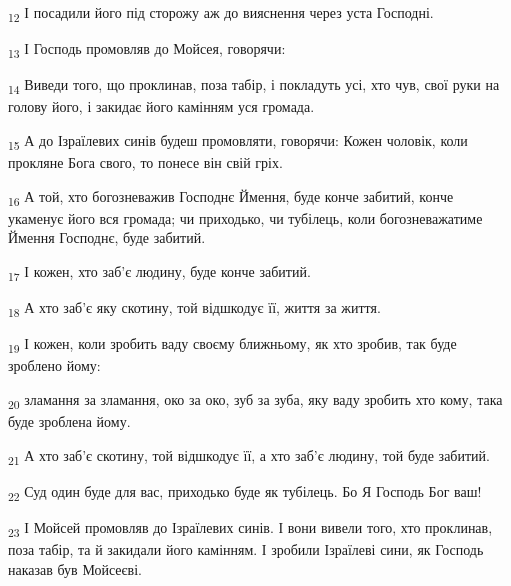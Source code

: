 \begin{tcolorbox}
\textsubscript{12} І посадили його під сторожу аж до вияснення через уста Господні.
\end{tcolorbox}
\begin{tcolorbox}
\textsubscript{13} І Господь промовляв до Мойсея, говорячи:
\end{tcolorbox}
\begin{tcolorbox}
\textsubscript{14} Виведи того, що проклинав, поза табір, і покладуть усі, хто чув, свої руки на голову його, і закидає його камінням уся громада.
\end{tcolorbox}
\begin{tcolorbox}
\textsubscript{15} А до Ізраїлевих синів будеш промовляти, говорячи: Кожен чоловік, коли прокляне Бога свого, то понесе він свій гріх.
\end{tcolorbox}
\begin{tcolorbox}
\textsubscript{16} А той, хто богозневажив Господнє Ймення, буде конче забитий, конче укаменує його вся громада; чи приходько, чи тубілець, коли богозневажатиме Ймення Господнє, буде забитий.
\end{tcolorbox}
\begin{tcolorbox}
\textsubscript{17} І кожен, хто заб'є людину, буде конче забитий.
\end{tcolorbox}
\begin{tcolorbox}
\textsubscript{18} А хто заб'є яку скотину, той відшкодує її, життя за життя.
\end{tcolorbox}
\begin{tcolorbox}
\textsubscript{19} І кожен, коли зробить ваду своєму ближньому, як хто зробив, так буде зроблено йому:
\end{tcolorbox}
\begin{tcolorbox}
\textsubscript{20} зламання за зламання, око за око, зуб за зуба, яку ваду зробить хто кому, така буде зроблена йому.
\end{tcolorbox}
\begin{tcolorbox}
\textsubscript{21} А хто заб'є скотину, той відшкодує її, а хто заб'є людину, той буде забитий.
\end{tcolorbox}
\begin{tcolorbox}
\textsubscript{22} Суд один буде для вас, приходько буде як тубілець. Бо Я Господь Бог ваш!
\end{tcolorbox}
\begin{tcolorbox}
\textsubscript{23} І Мойсей промовляв до Ізраїлевих синів. І вони вивели того, хто проклинав, поза табір, та й закидали його камінням. І зробили Ізраїлеві сини, як Господь наказав був Мойсеєві.
\end{tcolorbox}
